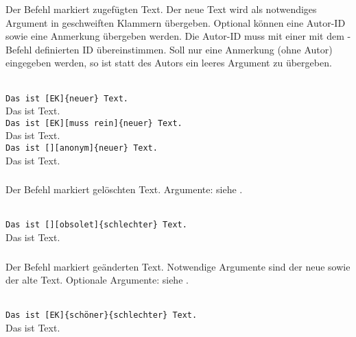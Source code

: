 Der Befehl  markiert zugefügten Text.
Der neue Text wird als notwendiges Argument in geschweiften Klammern übergeben.
Optional können eine Autor-ID sowie eine Anmerkung übergeben werden.
Die Autor-ID muss mit einer mit dem -Befehl definierten ID übereinstimmen.
Soll nur eine Anmerkung (ohne Autor) eingegeben werden, so ist statt des Autors ein leeres Argument zu übergeben.
\begin{chusage}
		\>\\
	\usageexample
		\>\texttt{Das ist [EK]\{neuer\} Text.}\\
		\>Das ist  Text.\\
		\>\texttt{Das ist [EK][muss rein]\{neuer\} Text.}\\
		\>Das ist  Text.\\
		\>\texttt{Das ist [][anonym]\{neuer\} Text.}\\
		\>Das ist  Text.
\end{chusage}

\subsubsection{}
\DescribeMacro{\deleted}

Der Befehl  markiert gelöschten Text.
Argumente: siehe .
\begin{chusage}
		\>\\
	\usageexample
		\>\texttt{Das ist [][obsolet]\{schlechter\} Text.}\\
		\>Das ist  Text.
\end{chusage}

\subsubsection{}
\DescribeMacro{\replaced}

Der Befehl  markiert geänderten Text.
Notwendige Argumente sind der neue sowie der alte Text.
Optionale Argumente: siehe .
\begin{chusage}
		\>\\
	\usageexample
		\>\texttt{Das ist [EK]\{schöner\}\{schlechter\} Text.}\\
		\>Das ist  Text.
\end{chusage}

